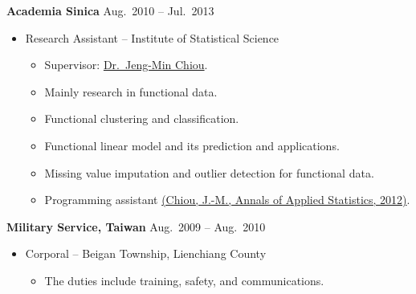 \documentclass[a4paper,10pt,dvipdfmx]{article}
\begin{document}
\textbf{Academia Sinica} \hfill Aug.~2010 -- Jul.~2013
\begin{itemize}[noitemsep,nolistsep]
  \item[] Research Assistant -- Institute of Statistical Science
    \begin{itemize}[noitemsep,nolistsep]
      \item[] \hspace{-3ex} Supervisor: \href{http://www.stat.sinica.edu.tw/jmchiou/}{Dr.~Jeng-Min Chiou}.
      \item Mainly research in functional data.
      \item Functional clustering and classification.
      \item Functional linear model and its prediction and applications.
      \item Missing value imputation and outlier detection for functional data.
      \item Programming assistant \href{https://projecteuclid.org/euclid.aoas/1356629052/}{(Chiou, J.-M., Annals of Applied Statistics, 2012)}.\\
    \end{itemize}
\end{itemize}

\textbf{Military Service, Taiwan} \hfill Aug.~2009 -- Aug.~2010
\begin{itemize}[noitemsep,nolistsep]
  \item[] Corporal -- Beigan Township, Lienchiang County
    \begin{itemize}[noitemsep,nolistsep]
      \item The duties include training, safety, and communications.\\
    \end{itemize}
\end{itemize}
\end{document}
